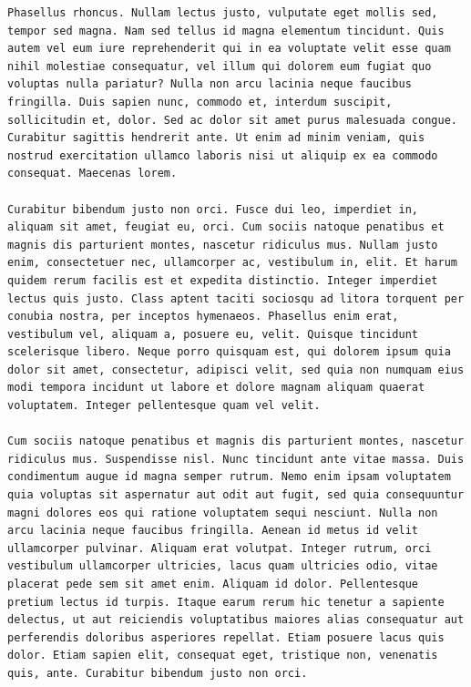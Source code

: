 \documentclass[a4paper, 12pt]{article}
\begin{document}
\begin{verbatim}
Phasellus rhoncus. Nullam lectus justo, vulputate eget mollis sed, tempor sed magna. Nam sed tellus id magna elementum tincidunt. Quis autem vel eum iure reprehenderit qui in ea voluptate velit esse quam nihil molestiae consequatur, vel illum qui dolorem eum fugiat quo voluptas nulla pariatur? Nulla non arcu lacinia neque faucibus fringilla. Duis sapien nunc, commodo et, interdum suscipit, sollicitudin et, dolor. Sed ac dolor sit amet purus malesuada congue. Curabitur sagittis hendrerit ante. Ut enim ad minim veniam, quis nostrud exercitation ullamco laboris nisi ut aliquip ex ea commodo consequat. Maecenas lorem.

Curabitur bibendum justo non orci. Fusce dui leo, imperdiet in, aliquam sit amet, feugiat eu, orci. Cum sociis natoque penatibus et magnis dis parturient montes, nascetur ridiculus mus. Nullam justo enim, consectetuer nec, ullamcorper ac, vestibulum in, elit. Et harum quidem rerum facilis est et expedita distinctio. Integer imperdiet lectus quis justo. Class aptent taciti sociosqu ad litora torquent per conubia nostra, per inceptos hymenaeos. Phasellus enim erat, vestibulum vel, aliquam a, posuere eu, velit. Quisque tincidunt scelerisque libero. Neque porro quisquam est, qui dolorem ipsum quia dolor sit amet, consectetur, adipisci velit, sed quia non numquam eius modi tempora incidunt ut labore et dolore magnam aliquam quaerat voluptatem. Integer pellentesque quam vel velit.

Cum sociis natoque penatibus et magnis dis parturient montes, nascetur ridiculus mus. Suspendisse nisl. Nunc tincidunt ante vitae massa. Duis condimentum augue id magna semper rutrum. Nemo enim ipsam voluptatem quia voluptas sit aspernatur aut odit aut fugit, sed quia consequuntur magni dolores eos qui ratione voluptatem sequi nesciunt. Nulla non arcu lacinia neque faucibus fringilla. Aenean id metus id velit ullamcorper pulvinar. Aliquam erat volutpat. Integer rutrum, orci vestibulum ullamcorper ultricies, lacus quam ultricies odio, vitae placerat pede sem sit amet enim. Aliquam id dolor. Pellentesque pretium lectus id turpis. Itaque earum rerum hic tenetur a sapiente delectus, ut aut reiciendis voluptatibus maiores alias consequatur aut perferendis doloribus asperiores repellat. Etiam posuere lacus quis dolor. Etiam sapien elit, consequat eget, tristique non, venenatis quis, ante. Curabitur bibendum justo non orci.


\end{verbatim}
\end{document}
